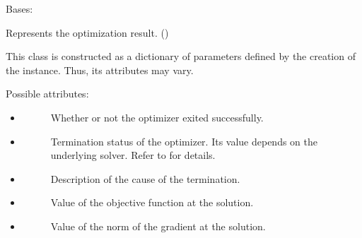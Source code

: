 \documentclass[a4paper,10pt,english]{sphinxmanual}
\begin{document}
\begin{fulllineitems}
\label{\detokenize{skprocrustes:skprocrustes.OptimizeResult}}
Bases: 

Represents the optimization result. 
()

This class is constructed as a dictionary of parameters defined by
the creation of the instance. Thus, its attributes may vary.

Possible attributes:
\begin{itemize}
\item {} \begin{description}
\item[{}] \leavevmode{[}\sphinxcode{bool}{]}
Whether or not the optimizer exited successfully.

\end{description}

\item {} \begin{description}
\item[{}] \leavevmode{[}\sphinxcode{int}{]}
Termination status of the optimizer. Its value depends on the
underlying solver. Refer to  for details.

\end{description}

\item {} \begin{description}
\item[{}] \leavevmode{[}\sphinxcode{str}{]}
Description of the cause of the termination.

\end{description}

\item {} \begin{description}
\item[{}] \leavevmode{[}\sphinxcode{float}{]}
Value of the objective function at the solution.

\end{description}

\item {} \begin{description}
\item[{}] \leavevmode{[}\sphinxcode{float}{]}
Value of the norm of the gradient at the solution.


\end{description}
\end{itemize}
\end{fulllineitems}
\end{document}
